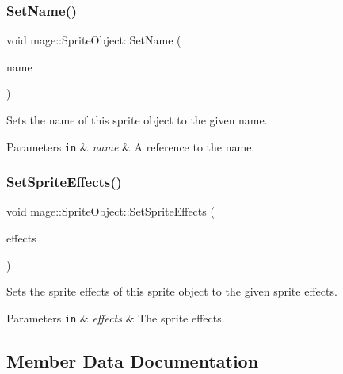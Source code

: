 \subsubsection{\texorpdfstring{Set\+Name()}{SetName()}}
{\footnotesize\ttfamily void mage\+::\+Sprite\+Object\+::\+Set\+Name (\begin{DoxyParamCaption}\item[{const string \&}]{name }\end{DoxyParamCaption})}

Sets the name of this sprite object to the given name.


\begin{DoxyParams}[1]{Parameters}
\mbox{\tt in}  & {\em name} & A reference to the name. \\
\hline
\end{DoxyParams}
\hypertarget{classmage_1_1_sprite_object_aef6cf252d79c9fcec978d83642da0e9a}{}\label{classmage_1_1_sprite_object_aef6cf252d79c9fcec978d83642da0e9a} 
\subsubsection{\texorpdfstring{Set\+Sprite\+Effects()}{SetSpriteEffects()}}
{\footnotesize\ttfamily void mage\+::\+Sprite\+Object\+::\+Set\+Sprite\+Effects (\begin{DoxyParamCaption}\item[{\hyperlink{namespacemage_a9cfe18123066ba4236f548f9de75d881}{Sprite\+Effect}}]{effects }\end{DoxyParamCaption})\hspace{0.3cm}{\ttfamily [noexcept]}}

Sets the sprite effects of this sprite object to the given sprite effects.


\begin{DoxyParams}[1]{Parameters}
\mbox{\tt in}  & {\em effects} & The sprite effects. \\
\hline
\end{DoxyParams}


\subsection{Member Data Documentation}
\hypertarget{classmage_1_1_sprite_object_a6694bb9cade83917202cf9ca6d359e81}{}\label{classmage_1_1_sprite_object_a6694bb9cade83917202cf9ca6d359e81} 

